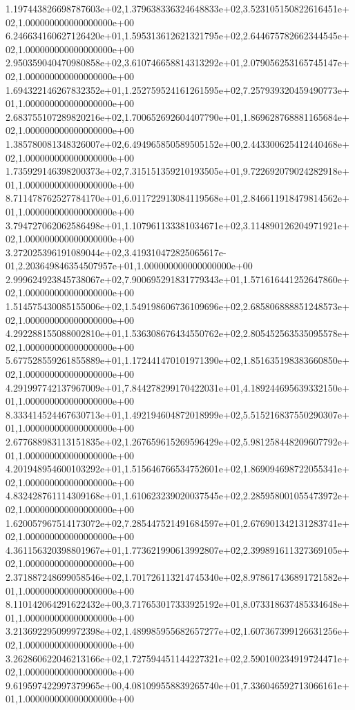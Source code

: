 1.197443826698787603e+02,1.379638336324648833e+02,3.523105150822616451e+02,1.000000000000000000e+00
6.246634160627126420e+01,1.595313612621321795e+02,2.644675782662344545e+02,1.000000000000000000e+00
2.950359040470980858e+02,3.610746658814313292e+01,2.079056253165745147e+02,1.000000000000000000e+00
1.694322146267832352e+01,1.252759524161261595e+02,7.257939320459490773e+01,1.000000000000000000e+00
2.683755107289820216e+02,1.700652692604407790e+01,1.869628768881165684e+02,1.000000000000000000e+00
1.385780081348326007e+02,6.494965850589505152e+00,2.443300625412440468e+02,1.000000000000000000e+00
1.735929146398200373e+02,7.315151359210193505e+01,9.722692079024282918e+01,1.000000000000000000e+00
8.711478762527784170e+01,6.011722913084119568e+01,2.846611918479814562e+01,1.000000000000000000e+00
3.794727062062586498e+01,1.107961133381034671e+02,3.114890126204971921e+02,1.000000000000000000e+00
3.272025396191089044e+02,3.419310472825065617e-01,2.203649846354507957e+01,1.000000000000000000e+00
2.999624923845738067e+02,7.900695291831779343e+01,1.571616441252647860e+02,1.000000000000000000e+00
1.514575430085155006e+02,1.549198606736109696e+02,2.685806888851248573e+02,1.000000000000000000e+00
4.292288155088002810e+01,1.536308676434550762e+02,2.805452563535095578e+02,1.000000000000000000e+00
5.677528559261855889e+01,1.172441470101971390e+02,1.851635198383660850e+02,1.000000000000000000e+00
4.291997742137967009e+01,7.844278299170422031e+01,4.189244695639332150e+01,1.000000000000000000e+00
8.333414524467630713e+01,1.492194604872018999e+02,5.515216837550290307e+01,1.000000000000000000e+00
2.677688983113151835e+02,1.267659615269596429e+02,5.981258448209607792e+01,1.000000000000000000e+00
4.201948954600103292e+01,1.515646766534752601e+02,1.869094698722055341e+02,1.000000000000000000e+00
4.832428761114309168e+01,1.610623239020037545e+02,2.285958001055473972e+02,1.000000000000000000e+00
1.620057967514173072e+02,7.285447521491684597e+01,2.676901342131283741e+02,1.000000000000000000e+00
4.361156320398801967e+01,1.773621990613992807e+02,2.399891611327369105e+02,1.000000000000000000e+00
2.371887248699058546e+02,1.701726113214745340e+02,8.978617436891721582e+01,1.000000000000000000e+00
8.110142064291622432e+00,3.717653017333925192e+01,8.073318637485334648e+01,1.000000000000000000e+00
3.213692295099972398e+02,1.489985955682657277e+02,1.607367399126631256e+02,1.000000000000000000e+00
3.262860622046213166e+02,1.727594451144227321e+02,2.590100234919724471e+02,1.000000000000000000e+00
9.619597422997379965e+00,4.081099558839265740e+01,7.336046592713066161e+01,1.000000000000000000e+00
